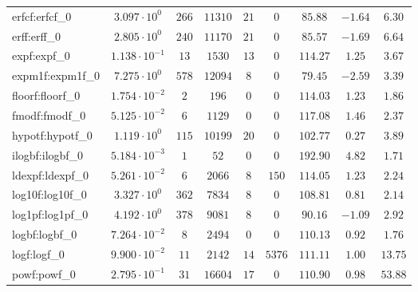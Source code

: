 \begin{tabular}{|l|c|c|c|c|c|c|c|c|}
erfcf:erfcf\_0               & $ 3.097 \cdot 10^{0}  $ & $ 266    $ & $ 11310  $ & $ 21  $ & $ 0    $ & $ 85.88       $ & $ -1.64   $ & $ 6.30    $ \\
erff:erff\_0                 & $ 2.805 \cdot 10^{0}  $ & $ 240    $ & $ 11170  $ & $ 21  $ & $ 0    $ & $ 85.57       $ & $ -1.69   $ & $ 6.64    $ \\
expf:expf\_0                 & $ 1.138 \cdot 10^{-1} $ & $ 13     $ & $ 1530   $ & $ 13  $ & $ 0    $ & $ 114.27      $ & $ 1.25    $ & $ 3.67    $ \\
expm1f:expm1f\_0             & $ 7.275 \cdot 10^{0}  $ & $ 578    $ & $ 12094  $ & $ 8   $ & $ 0    $ & $ 79.45       $ & $ -2.59   $ & $ 3.39    $ \\
floorf:floorf\_0             & $ 1.754 \cdot 10^{-2} $ & $ 2      $ & $ 196    $ & $ 0   $ & $ 0    $ & $ 114.03      $ & $ 1.23    $ & $ 1.86    $ \\
fmodf:fmodf\_0               & $ 5.125 \cdot 10^{-2} $ & $ 6      $ & $ 1129   $ & $ 0   $ & $ 0    $ & $ 117.08      $ & $ 1.46    $ & $ 2.37    $ \\
hypotf:hypotf\_0             & $ 1.119 \cdot 10^{0}  $ & $ 115    $ & $ 10199  $ & $ 20  $ & $ 0    $ & $ 102.77      $ & $ 0.27    $ & $ 3.89    $ \\
ilogbf:ilogbf\_0             & $ 5.184 \cdot 10^{-3} $ & $ 1      $ & $ 52     $ & $ 0   $ & $ 0    $ & $ 192.90      $ & $ 4.82    $ & $ 1.71    $ \\
ldexpf:ldexpf\_0             & $ 5.261 \cdot 10^{-2} $ & $ 6      $ & $ 2066   $ & $ 8   $ & $ 150  $ & $ 114.05      $ & $ 1.23    $ & $ 2.24    $ \\
log10f:log10f\_0             & $ 3.327 \cdot 10^{0}  $ & $ 362    $ & $ 7834   $ & $ 8   $ & $ 0    $ & $ 108.81      $ & $ 0.81    $ & $ 2.14    $ \\
log1pf:log1pf\_0             & $ 4.192 \cdot 10^{0}  $ & $ 378    $ & $ 9081   $ & $ 8   $ & $ 0    $ & $ 90.16       $ & $ -1.09   $ & $ 2.92    $ \\
logbf:logbf\_0               & $ 7.264 \cdot 10^{-2} $ & $ 8      $ & $ 2494   $ & $ 0   $ & $ 0    $ & $ 110.13      $ & $ 0.92    $ & $ 1.76    $ \\
logf:logf\_0                 & $ 9.900 \cdot 10^{-2} $ & $ 11     $ & $ 2142   $ & $ 14  $ & $ 5376 $ & $ 111.11      $ & $ 1.00    $ & $ 13.75   $ \\
powf:powf\_0                 & $ 2.795 \cdot 10^{-1} $ & $ 31     $ & $ 16604  $ & $ 17  $ & $ 0    $ & $ 110.90      $ & $ 0.98    $ & $ 53.88   $ \\

\end{tabular}
